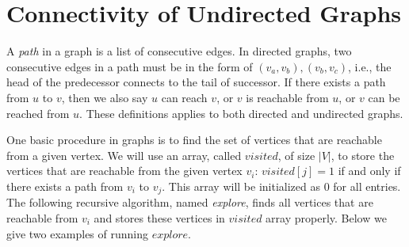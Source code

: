 \section{Connectivity of Undirected Graphs}

A \emph{path} in a graph is a list of consecutive edges.
In directed graphs, two consecutive edges in a path must be in the form of $(v_a, v_b), (v_b, v_c)$,
i.e., the head of the predecessor connects to the tail of successor. If there exists a path from $u$ to $v$,
then we also say $u$ can reach $v$, or $v$ is reachable from $u$, or $v$ can be reached from $u$.
These definitions applies to both directed and undirected graphs.

%


One basic procedure in graphs is to find the set of vertices that are reachable from a given vertex.
We will use an array, called $visited$, of size $|V|$, to store the vertices that are reachable from
the given vertex $v_i$: $visited[j] = 1$ if and only if there exists a path from $v_i$ to $v_j$.
This array will be initialized as 0 for all entries.
The following recursive algorithm, named \emph{explore}, finds all vertices that are reachable from $v_i$
and stores these vertices in $visited$ array properly.
Below we give two examples of running $explore$. 

\begin{minipage}{0.8\textwidth}
	\xxx
	\xxx
	\xxx
	\xxx
	\xxx
	\xxx
\end{minipage}

